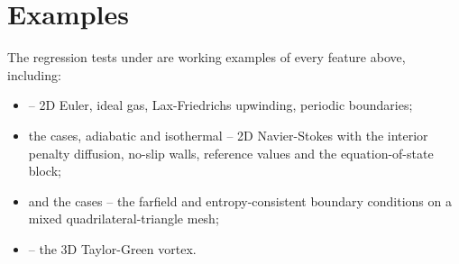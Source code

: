 \section{Examples}
The regression tests under
 are working examples
of every feature above, including:
\begin{itemize}
\item {} -- 2D Euler, ideal gas, Lax-Friedrichs
  upwinding, periodic boundaries;
\item the  cases, adiabatic and
  isothermal -- 2D Navier-Stokes with the interior
  penalty diffusion, no-slip walls, reference
  values and the equation-of-state block;
\item {} and the
   cases -- the farfield and
  entropy-consistent boundary conditions on a mixed
  quadrilateral-triangle mesh;
\item {} -- the 3D Taylor-Green vortex.
\end{itemize}
